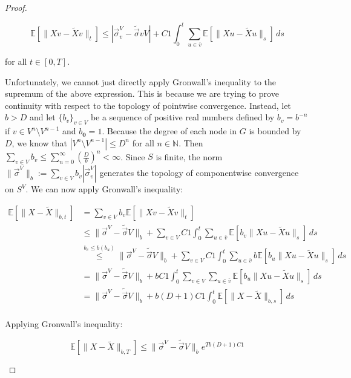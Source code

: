 \documentclass[12pt]{article}
\newcommand{\mb}{\mathbb}
\newcommand{\ov}{\overline}
\newcommand{\os}{\overset}
\newcommand{\ind}{\hspace{24pt}}
\newcommand{\ex}[1]{\mb{E}\left[#1\right]}			%
\renewcommand{\root}{\mathbf{0}}				%
\renewcommand{\v}{v}							%
\newcommand{\vv}{u}								%
\renewcommand{\S}{S}							%
\newcommand{\s}{\sigma}							%
\newcommand{\sv}{\vec{\s}}						%
\renewcommand{\b}{b}							%
\newcommand{\T}{T}								%
\renewcommand{\t}{t}							%
\renewcommand{\tt}{s}							%
\newcommand{\X}{X}								%
\newcommand{\carp}[1]{^{#1}}					%
\newcommand{\vsi}[1]{^{#1}}						%
\newcommand{\cind}[1]{_{#1}}					%
\newcommand{\cl}{\ov}							%
\newcommand{\const}{C}							%
\newcommand{\degr}{D}							%
\newcommand{\sln}[1]{^{#1}}						%
\newcommand{\alt}[1]{\widetilde{#1}}			%
\begin{document}
\begin{proof}
\begin{enumerate}[(a)]
\[\ex{\|\X{\v}{} - \alt{\X}{\v}{}\|_\t} \leq |\sv\cind{\v}\vsi{V} - \alt{\sv}{\v}{V}| + \const{1}\int_0^\t \sum_{\vv\in \cl{\v}} \ex{\|\X{\vv}{} - \alt{\X}{\vv}{}\|_\tt}\,d\tt\]

for all \(\t \in [0,\T]\).

\ind Unfortunately, we cannot just directly apply Gronwall's inequality to the supremum of the above expression. This is because we are trying to prove continuity with respect to the topology of pointwise convergence. Instead, let \(\b > \degr\) and let \(\{\b\cind{\v}\}_{\v \in V}\) be a sequence of positive real numbers defined by \(\b\cind{\v} = \b^{-n}\) if \(\v \in V\sln{n}\setminus V\sln{n-1}\) and \(\b\cind{\root} = 1\). Because the degree of each node in \(G\) is bounded by \(\degr\), we know that \(|V\sln{n}\setminus V\sln{n-1}| \leq \degr^{n}\) for all \(n\in \mb{N}\). Then \(\sum_{\v \in V} \b\cind{\v} \leq \sum_{n=0}^\infty \left(\frac{\degr}{\b}\right)^{n} < \infty\). Since \(\S\) is finite, the norm \(\|\sv\cind{}\vsi{V}\|_{\b} := \sum_{\v \in V} \b\cind{\v}|\sv\cind{\v}\vsi{V}|\) generates the topology of componentwise convergence on \(\S\carp{V}\). We can now apply Gronwall's inequality:

\begin{align*}
\ex{\|\X{}{} - \alt{\X}{}{}\|_{\b,\t}} &= \sum_{\v \in V} \b\cind{\v}\ex{\|\X{\v}{} - \alt{\X}{\v}{}\|_\t}\\
&\leq \|\sv\cind{}\vsi{V} - \alt{\sv}{}{V}\|_{\b} + \sum_{\v \in V}\const{1}\int_0^\t \sum_{\vv \in \cl{\v}} \ex{\b\cind{\v}\|\X{\vv}{} - \alt{\X}{\vv}{}\|_\tt}\,d\tt\\
&\os{\b\cind{\v}\leq \b(\b\cind{\vv})}{\leq} \|\sv\cind{}\vsi{V} - \alt{\sv}{}{V}\|_{\b} + \sum_{\v \in V}\const{1}\int_0^\t \sum_{\vv \in \cl{\v}} \b\ex{\b\cind{\vv}\|\X{\vv}{} - \alt{\X}{\vv}{}\|_\tt}\,d\tt\\
&= \|\sv\cind{}\vsi{V} - \alt{\sv}{}{V}\|_{\b} + \b\const{1}\int_0^\t \sum_{\v \in V}\sum_{\vv \in \cl{\v}} \ex{\b\cind{\vv}\|\X{\vv}{} - \alt{\X}{\vv}{}\|_\tt}\,d\tt\\
&=\|\sv\cind{}\vsi{V} - \alt{\sv}{}{V}\|_{\b} + \b(\degr+1)\const{1}\int_0^\t \ex{\|\X{}{} - \alt{\X}{}{}\|_{\b,\tt}}\,d\tt\\
\end{align*}

Applying Gronwall's inequality:

\[\ex{\|\X{}{} - \alt{\X}{}{}\|_{\b,\T}} \leq \|\sv\cind{}\vsi{V} - \alt{\sv}{}{V}\|_{\b}e^{\T\b(\degr+1)\const{1}}\]


\end{enumerate}
\end{proof}
\end{document}
